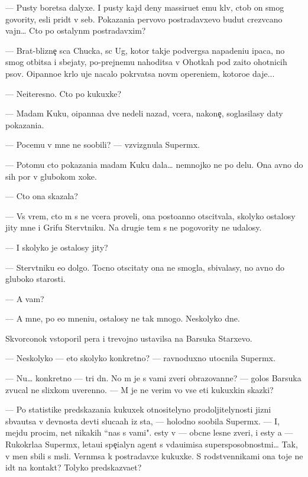 \documentclass[12pt]{book}
\begin{document}
— Pusty boretsa dalyxe. I pusty kajd{\yi}{\y} deny massiru{\y}et {\y}emu kl{\io}v, ctob{\yi} on smog govority, {\y}esli prid{\e}t v seb{\ia}. Pokazani{\y}a pervovo postradavxevo budut crezv{\yi}ca{\y}no vajn{\yi}… Cto po ostalyn{\yi}m postradavxim?

— Brat-blizne{\c} s{\yi}ca Chucka, s{\yi}c Ug, kotor{\yi}{\y} takje podvergsa napadeni{\y}u {\X}ipaca, no smog otbitsa i sbejaty, po-prejnemu nahoditsa v Ohotkah pod za{\x}ito{\y} ohotnic{\yf}ih psov. O{\x}ipanno{\y}e kr{\yi}lo uje nacalo pokr{\yi}vatsa nov{\yi}m opereni{\y}em, kotoro{\y}e daje...

— Neiteresno. Cto po kukuxke?

— Madam Kuku, o{\x}ipanna{\y}a dve nedeli nazad, vcera, na\-ko\-ne{\c}, soglasilasy daty pokazani{\y}a.

— Po\-ce\-mu v{\yi} mne ne soob{\x}ili? — vzvizgnula Superm{\yi}x.

— Potomu cto pokazani{\y}a madam Kuku dala… nemnojko ne po delu. Ona {\y}avno do sih por v glubokom xoke.

— Cto ona skazala?

— Vs{\e} vrem{\ia}, cto m{\yi} s ne{\y} vcera proveli, ona posto{\y}anno otscit{\yi}vala, skoly\-ko ostalosy jity mne i Grifu Sterv{\ia}tniku. Na drugi{\y}e tem{\yi} s ne{\y} po\-go\-vo\-rity ne udalosy.

— I skoly\-ko je ostalosy jity?

— Sterv{\ia}tniku {\y}e{\x}o dolgo. Tocno otscitaty ona ne smogla, sbivalasy, no {\y}avno do gluboko{\y} starosti.

— A vam?

— A mne, po {\y}e{\y}o mneni{\y}u, ostalosy ne tak mnogo. Neskolyko dne{\y}.

Skvorconok vstopor{\x}il per{\y}a i trevojno ustavilsa na Barsuka Starxevo.

— Neskolyko — eto skoly\-ko konkretno? — ravnoduxno utocnila Superm{\yi}x.

— Nu… konkretno — tri dn{\ia}. No m{\yi} je s vami zveri obrazovann{\yi}{\y}e? — golos Barsuka zvucal ne slixkom uverenno. — M{\yi} je ne verim vo vse eti kukuxkin{\yi} skazki?

— Po statistike predskazani{\y}a kukuxek otnositelyno prodoljitelynosti jizni sb{\yi}va{\y}utsa v dev{\ia}nosta dev{\ia}ti sluca{\y}ah iz sta, — holodno soob{\x}ila Superm{\yi}x. — I, mejdu procim, net nikakih ``nas s vami". {\Y}esty v{\yi} — ob{\yi}cn{\yi}{\y}e lesn{\yi}{\y}e zveri, i {\y}esty {\y}a — Rukokr{\yi}la{\y}a Superm{\yi}x, leta{\y}u{\x}i{\y} spe{\c}ialyn{\yi}{\y} agent s v{\yi}\-da\-{\y}u\-{\x}i\-misa supersposobnost{\ia}mi… Tak, v{\yi} men{\ia} sbili s m{\yi}sli. Vern{\e}msa k postradavxe{\y} kukuxke. S rodstvennikami ona toje ne id{\e}t na kontakt? Tolyko predskaz{\yi}va{\y}et?
\end{document}

